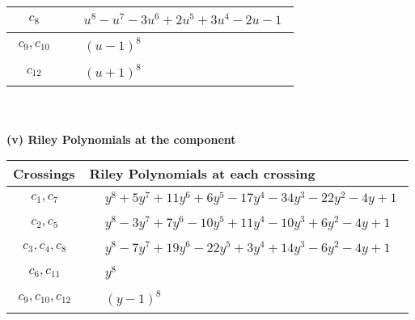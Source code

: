 \documentclass[1p]{elsarticle_modified}
\theoremstyle{definition}
\begin{document}
\begin{tabular}{m{50pt}|m{274pt}}
\hline $$\begin{aligned}c_{8}\end{aligned}$$&$\begin{aligned}
&u^8- u^7-3 u^6+2 u^5+3 u^4-2 u-1
\end{aligned}$\\
\hline $$\begin{aligned}c_{9},c_{10}\end{aligned}$$&$\begin{aligned}
&(u-1)^8
\end{aligned}$\\
\hline $$\begin{aligned}c_{12}\end{aligned}$$&$\begin{aligned}
&(u+1)^8
\end{aligned}$\\
\hline
\end{tabular}\\~\\
\newpage\renewcommand{\arraystretch}{1}
\flushleft \textbf{(v) Riley Polynomials at the component}\newline \\
\begin{tabular}{m{50pt}|m{274pt}}
Crossings & \hspace{64pt}Riley Polynomials at each crossing \\
\hline $$\begin{aligned}c_{1},c_{7}\end{aligned}$$&$\begin{aligned}
&y^8+5 y^7+11 y^6+6 y^5-17 y^4-34 y^3-22 y^2-4 y+1
\end{aligned}$\\
\hline $$\begin{aligned}c_{2},c_{5}\end{aligned}$$&$\begin{aligned}
&y^8-3 y^7+7 y^6-10 y^5+11 y^4-10 y^3+6 y^2-4 y+1
\end{aligned}$\\
\hline $$\begin{aligned}c_{3},c_{4},c_{8}\end{aligned}$$&$\begin{aligned}
&y^8-7 y^7+19 y^6-22 y^5+3 y^4+14 y^3-6 y^2-4 y+1
\end{aligned}$\\
\hline $$\begin{aligned}c_{6},c_{11}\end{aligned}$$&$\begin{aligned}
&y^8
\end{aligned}$\\
\hline $$\begin{aligned}c_{9},c_{10},c_{12}\end{aligned}$$&$\begin{aligned}
&(y-1)^8
\end{aligned}$\\
\hline
\end{tabular}\\~\\
\end{document}
